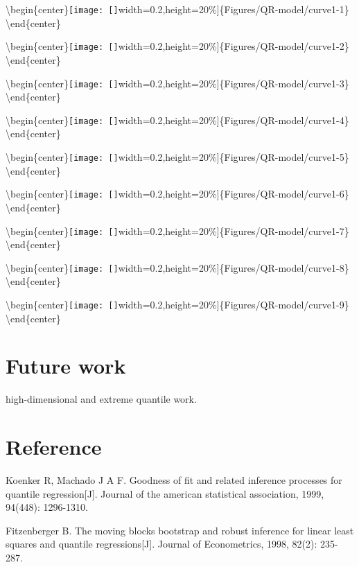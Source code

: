 \documentclass[11pt,a4paper,]{article}
\theoremstyle{definition}
\theoremstyle{definition}
\theoremstyle{remark}
\begin{document}
\textbackslash{}begin\{center\}\texttt{[image: []}width=0.2\linewidth,height=20\%{]}\{Figures/QR-model/curve1-1\}
\textbackslash{}end\{center\}

\textbackslash{}begin\{center\}\texttt{[image: []}width=0.2\linewidth,height=20\%{]}\{Figures/QR-model/curve1-2\}
\textbackslash{}end\{center\}

\textbackslash{}begin\{center\}\texttt{[image: []}width=0.2\linewidth,height=20\%{]}\{Figures/QR-model/curve1-3\}
\textbackslash{}end\{center\}

\textbackslash{}begin\{center\}\texttt{[image: []}width=0.2\linewidth,height=20\%{]}\{Figures/QR-model/curve1-4\}
\textbackslash{}end\{center\}

\textbackslash{}begin\{center\}\texttt{[image: []}width=0.2\linewidth,height=20\%{]}\{Figures/QR-model/curve1-5\}
\textbackslash{}end\{center\}

\textbackslash{}begin\{center\}\texttt{[image: []}width=0.2\linewidth,height=20\%{]}\{Figures/QR-model/curve1-6\}
\textbackslash{}end\{center\}

\textbackslash{}begin\{center\}\texttt{[image: []}width=0.2\linewidth,height=20\%{]}\{Figures/QR-model/curve1-7\}
\textbackslash{}end\{center\}

\textbackslash{}begin\{center\}\texttt{[image: []}width=0.2\linewidth,height=20\%{]}\{Figures/QR-model/curve1-8\}
\textbackslash{}end\{center\}

\textbackslash{}begin\{center\}\texttt{[image: []}width=0.2\linewidth,height=20\%{]}\{Figures/QR-model/curve1-9\}
\textbackslash{}end\{center\}

\section{Future work}\label{future-work}

high-dimensional and extreme quantile work.

\section{Reference}\label{reference}

Koenker R, Machado J A F. Goodness of fit and related inference
processes for quantile regression{[}J{]}. Journal of the american
statistical association, 1999, 94(448): 1296-1310.

Fitzenberger B. The moving blocks bootstrap and robust inference for
linear least squares and quantile regressions{[}J{]}. Journal of
Econometrics, 1998, 82(2): 235-287.
\end{document}
